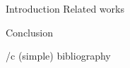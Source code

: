 
\draft     %

\makefront  %

\chap Introduction
\chap Related works






\chap Conclusion

\bibchap
\usebib/c (simple) bibliography


\bye
